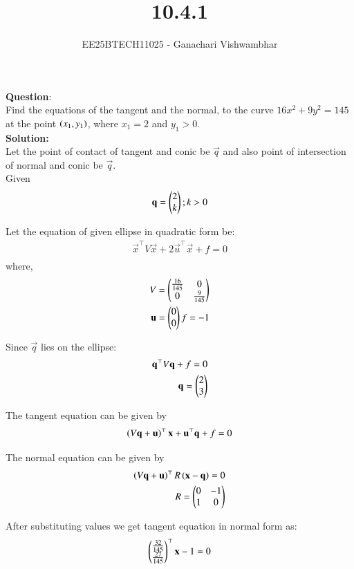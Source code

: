 \documentclass[journal]{IEEEtran}
\begin{document}
\title{10.4.1}
\author{EE25BTECH11025 - Ganachari Vishwambhar}
\maketitle

\textbf{Question}:\\
Find the equations of the tangent and the normal, to the curve $16x^2+9y^2=145$ at the point $\left(x_1,y_1\right)$, where $x_1=2$ and $y_1>0$.\\
\textbf{Solution: }\\
Let the point of contact of tangent and conic be $\vec{q}$ and also point of intersection of normal and conic be $\vec{q}$.\\
Given
\begin{align}
    \mathbf{q}=\begin{pmatrix}2\\k\end{pmatrix};k>0
\end{align}

Let the equation of given ellipse in quadratic form be:
\begin{align}
    \vec{x}^\top V\vec{x}+2\vec{u}^\top\vec{x}+f=0\\
\end{align}
where,
\begin{align}
    V=\begin{pmatrix}\frac{16}{145}&0\\0&\frac{9}{145}\end{pmatrix}\\
    \mathbf{u} = \begin{pmatrix}0\\0\end{pmatrix}
    f=-1
\end{align}

Since $\vec{q}$ lies on the ellipse:
\begin{align}
    \mathbf{q}^\top V\mathbf{q}+f=0\\
    \mathbf{q} = \begin{pmatrix}2\\3\end{pmatrix}
\end{align}

The tangent equation can be given by
\begin{align}
    \left(V\mathbf{q}+\mathbf{u}\right)^\top\mathbf{x}+\mathbf{u}^\top\mathbf{q}+f=0
\end{align}

The normal equation can be given by
\begin{align}
    \left(V\mathbf{q}+\mathbf{u}\right)^\top R\left(\mathbf{x}-\mathbf{q}\right)=0\\
    R=\begin{pmatrix}0&-1\\1&0\end{pmatrix}
\end{align}

After substituting values we get tangent equation in normal form as:
\begin{align}
    \begin{pmatrix}\frac{32}{145}\\\frac{27}{145}\end{pmatrix}^\top\mathbf{x}-1=0
\end{align}
\end{document}
